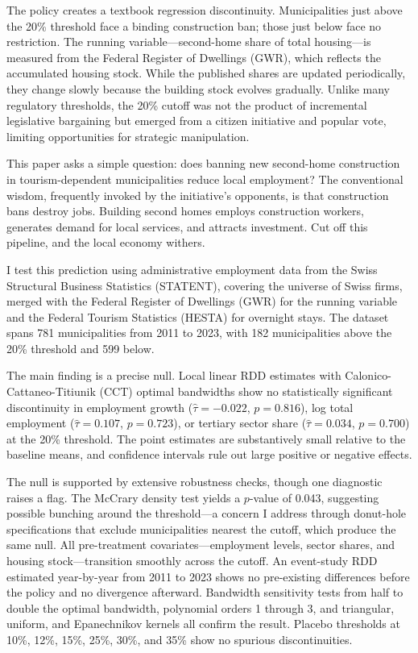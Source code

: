 \documentclass[12pt]{article}
\begin{document}
The policy creates a textbook regression discontinuity. Municipalities just above the 20\% threshold face a binding construction ban; those just below face no restriction. The running variable---second-home share of total housing---is measured from the Federal Register of Dwellings (GWR), which reflects the accumulated housing stock. While the published shares are updated periodically, they change slowly because the building stock evolves gradually. Unlike many regulatory thresholds, the 20\% cutoff was not the product of incremental legislative bargaining but emerged from a citizen initiative and popular vote, limiting opportunities for strategic manipulation.

This paper asks a simple question: does banning new second-home construction in tourism-dependent municipalities reduce local employment? The conventional wisdom, frequently invoked by the initiative's opponents, is that construction bans destroy jobs. Building second homes employs construction workers, generates demand for local services, and attracts investment. Cut off this pipeline, and the local economy withers.

I test this prediction using administrative employment data from the Swiss Structural Business Statistics (STATENT), covering the universe of Swiss firms, merged with the Federal Register of Dwellings (GWR) for the running variable and the Federal Tourism Statistics (HESTA) for overnight stays. The dataset spans 781 municipalities from 2011 to 2023, with 182 municipalities above the 20\% threshold and 599 below.

The main finding is a precise null. Local linear RDD estimates with Calonico-Cattaneo-Titiunik (CCT) optimal bandwidths show no statistically significant discontinuity in employment growth ($\hat{\tau} = -0.022$, $p = 0.816$), log total employment ($\hat{\tau} = 0.107$, $p = 0.723$), or tertiary sector share ($\hat{\tau} = 0.034$, $p = 0.700$) at the 20\% threshold. The point estimates are substantively small relative to the baseline means, and confidence intervals rule out large positive or negative effects.

The null is supported by extensive robustness checks, though one diagnostic raises a flag. The McCrary density test yields a $p$-value of 0.043, suggesting possible bunching around the threshold---a concern I address through donut-hole specifications that exclude municipalities nearest the cutoff, which produce the same null. All pre-treatment covariates---employment levels, sector shares, and housing stock---transition smoothly across the cutoff. An event-study RDD estimated year-by-year from 2011 to 2023 shows no pre-existing differences before the policy and no divergence afterward. Bandwidth sensitivity tests from half to double the optimal bandwidth, polynomial orders 1 through 3, and triangular, uniform, and Epanechnikov kernels all confirm the result. Placebo thresholds at 10\%, 12\%, 15\%, 25\%, 30\%, and 35\% show no spurious discontinuities.
\end{document}
